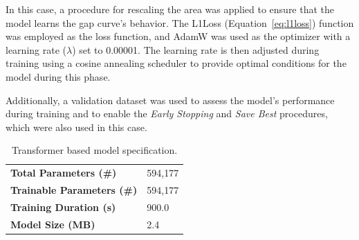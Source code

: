 In this case, a procedure for rescaling the area was applied to ensure that the
model learns the gap curve's behavior.
The L1Loss (Equation~\ref{eq:l1loss}) function was employed as the loss function, and AdamW \cite{adamw} was used as the
optimizer with a learning rate ($\lambda$) set to 0.00001.
The learning rate is then adjusted during training using a cosine annealing scheduler \cite{scheduler1} \cite{scheduler2}
to provide optimal conditions for the model during this phase.

Additionally, a validation dataset was used to assess the model's
performance during training and to enable the
\textit{Early Stopping} and \textit{Save Best} procedures,
which were also used in this case.



\begin{table}[H]
	\begin{center}
		\begin{tabular}[c]{l|l}
			\textbf{Total Parameters (\#)}     & 594,177 \\
			\textbf{Trainable Parameters (\#)} & 594,177 \\
			\textbf{Training Duration (s)}     & 900.0   \\
			\textbf{Model Size (MB)}           & 2.4
		\end{tabular}
	\end{center}
	\caption{Transformer based model specification.}\label{tab:gabspecs}
\end{table}

